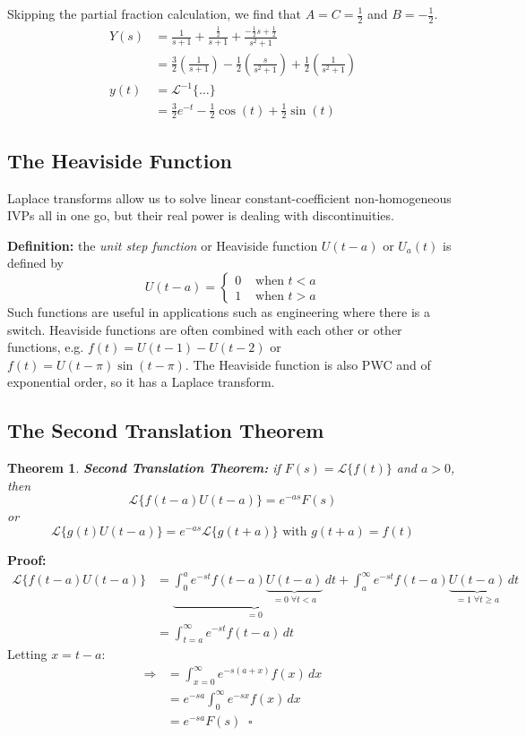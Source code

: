 \documentclass[11pt]{article}
\newtheorem{thm}{Theorem}[section]
\newcommand{\definition}{\textbf{Definition: }}
\newcommand{\lap}{\mathcal{L}}
\newcommand{\intzi}{\int_0^{\infty}}
\newcommand{\lapft}{\lap\{f(t)\}}
\newcommand{\lapi}{\lap^{-1}}
\begin{document}
	Skipping the partial fraction calculation, we find that $A = C = \frac{1}{2}$ and $B = - \frac{1}{2}$.
		\begin{align*}
			Y(s) &= \frac{1}{s+1} + \frac{\frac{1}{2}}{s+1} + \frac{-\frac{1}{2} s + \frac{1}{2}}{s^2 + 1} \\
				&= \frac{3}{2} \left(\frac{1}{s+1}\right) - \frac{1}{2}\left(\frac{s}{s^2 + 1}\right) + \frac{1}{2} \left(\frac{1}{s^2 + 1}\right) \\
			y(t) &= \lapi\{\ldots\} \\
				&= \frac{3}{2} e^{-t} - \frac{1}{2} \cos(t) + \frac{1}{2} \sin(t)
		\end{align*}

\subsection{The Heaviside Function}
	Laplace transforms allow us to solve linear constant-coefficient non-homogeneous IVPs all in one go, but their real power is dealing with discontinuities.

	\definition the \emph{unit step function} or {Heaviside function} $U(t-a)$ or $U_a (t)$ is defined by
		$$ U(t-a) = \left\{
				\begin{array}{cc}
					0 & \text{ when } t < a \\
					1 & \text{ when } t > a
				\end{array}
			\right.
		$$
	Such functions are useful in applications such as engineering where there is a switch. Heaviside functions are often combined with each other or other functions, e.g. $f(t) = U(t-1) - U(t-2)$ or $f(t) = U(t - \pi) \sin(t - \pi)$. The Heaviside function is also PWC and of exponential order, so it has a Laplace transform.

\subsection{The Second Translation Theorem}
	\begin{thm}
		\textbf{Second Translation Theorem:} if $F(s) = \lapft$ and $a > 0$, then
			$$ \lap\{f(t-a) U(t-a)\} = e^{-as} F(s) $$
		or
			$$ \lap\{g(t) U(t-a)\} = e^{-as} \lap\{g(t+a)\} \text{ with } g(t+a) = f(t) $$
	\end{thm}

	\textbf{Proof:}
		\begin{align*}
			\lap\{f(t-a) U(t-a)\} &= \underbrace{\int_0^a e^{-st} f(t-a) \underbrace{U(t-a)}_{ =0 \; \forall t < a} \,dt}_{= 0} + \int_a^{\infty} e^{-st} f(t-a) \underbrace{U(t-a)}_{= 1 \; \forall t \geq a} \,dt \\
				&= \int_{t=a}^{\infty} e^{-st} f(t-a) \,dt
		\end{align*}
	Letting $x = t-a$:
		\begin{align*}
			\Rightarrow &= \int_{x=0}^{\infty} e^{-s(a+x)} f(x) \,dx \\
				&= e^{-sa} \intzi e^{-sx} f(x) \,dx \\
				&= e^{-sa} F(s) \; \; \square
		\end{align*}
\end{document}
